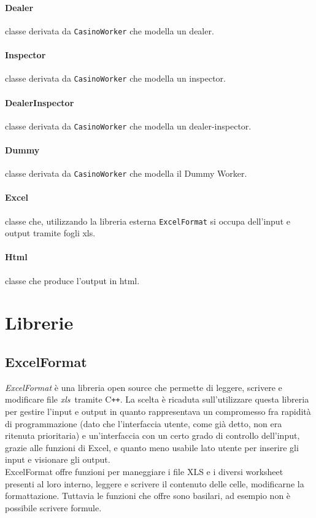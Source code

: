 \paragraph{Dealer} classe derivata da \texttt{CasinoWorker} che modella un dealer.
\paragraph{Inspector} classe derivata da \texttt{CasinoWorker} che modella un inspector.
\paragraph{DealerInspector} classe derivata da \texttt{CasinoWorker} che modella un dealer-inspector.
\paragraph{Dummy} classe derivata da \texttt{CasinoWorker} che modella il Dummy Worker.
\paragraph{Excel} classe che, utilizzando la libreria esterna \texttt{ExcelFormat} si occupa dell'input e output tramite fogli xls.
\paragraph{Html} classe che produce l'output in html.
\section{Librerie}
\subsection{ExcelFormat}
\textit{ExcelFormat} \cite{site:excel} è una libreria open source che permette di leggere, scrivere e modificare file \emph{\gls{xls}}\glsfirstoccur\ tramite C\texttt{++}. La scelta è ricaduta sull'utilizzare questa libreria per gestire l'input e output in quanto rappresentava un compromesso fra rapidità di programmazione (dato che l'interfaccia utente, come già detto, non era ritenuta prioritaria) e un'interfaccia con un certo grado di controllo dell'input, grazie alle funzioni di Excel, e quanto meno usabile lato utente per inserire gli input e visionare gli output. \\
ExcelFormat offre funzioni per maneggiare i file XLS e i diversi worksheet presenti al loro interno, leggere e scrivere il contenuto delle celle, modificarne la formattazione. Tuttavia le funzioni che offre sono basilari, ad esempio non è possibile scrivere formule.
